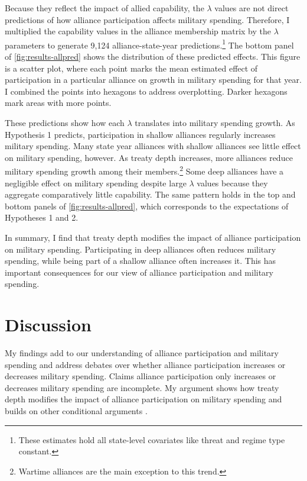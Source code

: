 \documentclass[12pt]{article}
\begin{document}
Because they reflect the impact of allied capability, the $\lambda$ values are not direct predictions of how alliance participation affects military spending. 
Therefore, I multiplied the capability values in the alliance membership matrix by the $\lambda$ parameters to generate 9,124 alliance-state-year predictions.\footnote{These estimates hold all state-level covariates like threat and regime type constant.} 
The bottom panel of \autoref{fig:results-allpred} shows the distribution of these predicted effects. 
This figure is a scatter plot, where each point marks the mean estimated effect of participation in a particular alliance on growth in military spending for that year.
I combined the points into hexagons to address overplotting. 
Darker hexagons mark areas with more points. 


These predictions show how each $\lambda$ translates into military spending growth. 
As Hypothesis 1 predicts, participation in shallow alliances regularly increases military spending. 
Many state year alliances with shallow alliances see little effect on military spending, however. 
As treaty depth increases, more alliances reduce military spending growth among their members.\footnote{Wartime alliances are the main exception to this trend.}
Some deep alliances have a negligible effect on military spending despite large $\lambda$ values because they aggregate comparatively little capability. 
The same pattern holds in the top and bottom panels of \autoref{fig:results-allpred}, which corresponds to the expectations  of Hypotheses 1 and 2. 


In summary, I find that treaty depth modifies the impact of alliance participation on military spending.  
Participating in deep alliances often reduces military spending, while being part of a shallow alliance often increases it. 
This has important consequences for our view of alliance participation and military spending. 



\section{Discussion}


My findings add to our understanding of alliance participation and military spending and address debates over whether alliance participation increases or decreases military spending. 
Claims alliance participation only increases or decreases military spending are incomplete. 
My argument shows how treaty depth modifies the impact of alliance participation on military spending and builds on other conditional arguments \citep{DigiuseppePoast2016}. 
\end{document}
